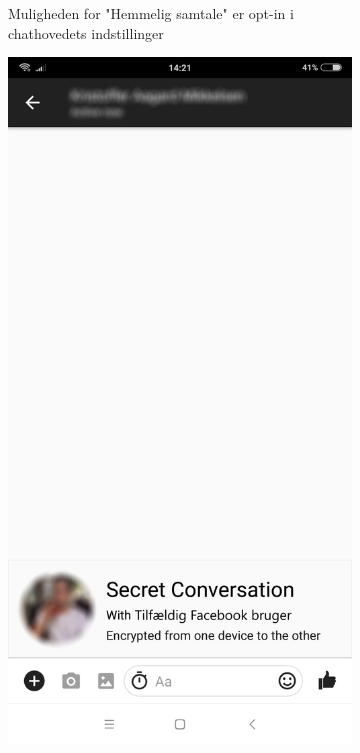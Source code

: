 \begin{figure}[H]
\begin{subfigure}{0.33\textwidth}
        \caption{Muligheden for "Hemmelig samtale" er opt-in i chathovedets indstillinger}
        \label{fig:facebookchat3}
    \end{subfigure}
    \begin{center}
        \begin{subfigure}{0.33\textwidth}
            \centering
            \includegraphics[scale=0.15]{Projectdoc/Problemanalyse/Illustrationer/4-fbchat.png} 

\end{subfigure}
\end{center}
\end{figure}
